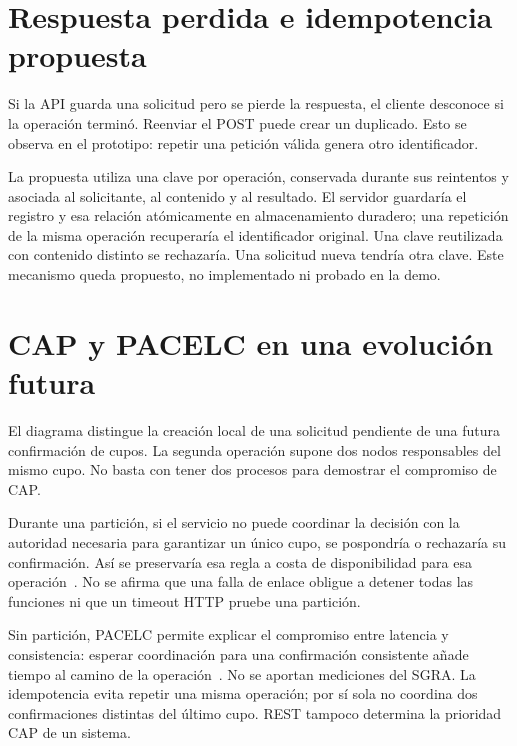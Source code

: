 \section*{Respuesta perdida e idempotencia propuesta}
Si la API guarda una solicitud pero se pierde la respuesta, el cliente desconoce si la operación terminó. Reenviar el POST puede crear un duplicado. Esto se observa en el prototipo: repetir una petición válida genera otro identificador.

La propuesta utiliza una clave por operación, conservada durante sus reintentos y asociada al solicitante, al contenido y al resultado. El servidor guardaría el registro y esa relación atómicamente en almacenamiento duradero; una repetición de la misma operación recuperaría el identificador original. Una clave reutilizada con contenido distinto se rechazaría. Una solicitud nueva tendría otra clave. Este mecanismo queda propuesto, no implementado ni probado en la demo.

\newpage
\section*{CAP y PACELC en una evolución futura}
El diagrama distingue la creación local de una solicitud pendiente de una futura confirmación de cupos. La segunda operación supone dos nodos responsables del mismo cupo. No basta con tener dos procesos para demostrar el compromiso de CAP.

Durante una partición, si el servicio no puede coordinar la decisión con la autoridad necesaria para garantizar un único cupo, se pospondría o rechazaría su confirmación. Así se preservaría esa regla a costa de disponibilidad para esa operación~\cite{gilbert-lynch-cap-khriz}. No se afirma que una falla de enlace obligue a detener todas las funciones ni que un timeout HTTP pruebe una partición.

Sin partición, PACELC permite explicar el compromiso entre latencia y consistencia: esperar coordinación para una confirmación consistente añade tiempo al camino de la operación~\cite{abadi-pacelc-khriz}. No se aportan mediciones del SGRA. La idempotencia evita repetir una misma operación; por sí sola no coordina dos confirmaciones distintas del último cupo. REST tampoco determina la prioridad CAP de un sistema.

